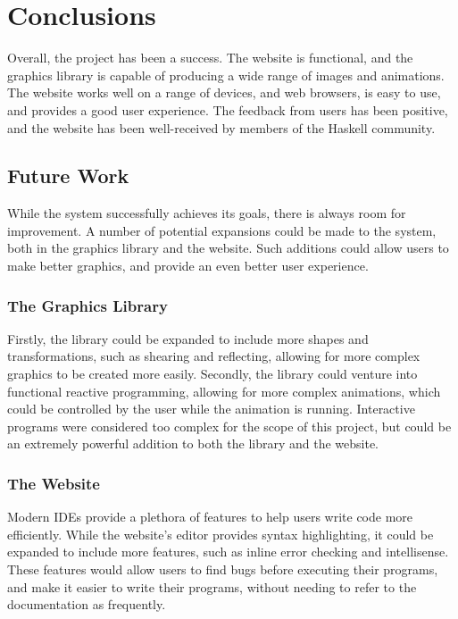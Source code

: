 \documentclass[../main.tex]{subfiles}
\begin{document}
\chapter{Conclusions} \label{ch:conclusions}
    Overall, the project has been a success.
    The website is functional, and the graphics library is capable of producing a
        wide range of images and animations.
    The website works well on a range of devices, and web browsers, is easy to use,
        and provides a good user experience.
    The feedback from users has been positive, and the website has been
        well-received by members of the Haskell community.

    \section{Future Work}
        While the system successfully achieves its goals, there is always room for
            improvement.
        A number of potential expansions could be made to the system, both in the
            graphics library and the website.
        Such additions could allow users to make better graphics, and provide an even
            better user experience.

        \subsection{The Graphics Library}
            Firstly, the library could be expanded to include more shapes and
                transformations, such as shearing and reflecting, allowing for more complex
                graphics to be created more easily.
            Secondly, the library could venture into functional reactive programming,
                allowing for more complex animations, which could be controlled by the user
                while the animation is running.
            Interactive programs were considered too complex for the scope of this project,
                but could be an extremely powerful addition to both the library and the
                website.

        \subsection{The Website}
            Modern IDEs provide a plethora of features to help users write code more
                efficiently.
            While the website's editor provides syntax highlighting, it could be expanded
                to include more features, such as inline error checking and intellisense.
            These features would allow users to find bugs before executing their programs,
                and make it easier to write their programs, without needing to refer to the
                documentation as frequently.
\end{document}
